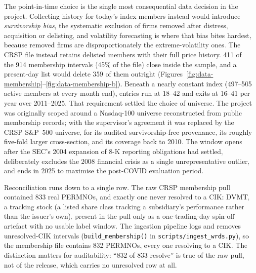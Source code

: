 The point-in-time choice is the single most consequential data decision in the project. Collecting history for today's index members instead would introduce \emph{survivorship bias}, the systematic exclusion of firms removed after distress, acquisition or delisting, and volatility forecasting is where that bias bites hardest, because removed firms are disproportionately the extreme-volatility ones. The CRSP file instead retains delisted members with their full price history. 411 of the 914 membership intervals (45\% of the file) close inside the sample, and a present-day list would delete 359 of them outright (Figures~\ref{fig:data-membership}--\ref{fig:data-membership-b}). %
Beneath a nearly constant index (497--505 active members at every month end), entries run at 18--42 and exits at 16--41 per year over 2011--2025. %
That requirement settled the choice of universe. The project was originally scoped around a Nasdaq-100 universe reconstructed from public membership records; with the supervisor's agreement it was replaced by the CRSP S\&P~500 universe, for its audited survivorship-free provenance, its roughly five-fold larger cross-section, and its coverage back to 2010. %
The window opens after the SEC's 2004 expansion of 8-K reporting obligations had settled, deliberately excludes the 2008 financial crisis as a single unrepresentative outlier, and ends in 2025 to maximise the post-COVID evaluation period.

Reconciliation runs down to a single row. The raw CRSP membership pull contained 833 real PERMNOs, and exactly one never resolved to a CIK: DVMT, a tracking stock (a listed share class tracking a subsidiary's performance rather than the issuer's own), present in the pull only as a one-trading-day spin-off artefact with no usable label window. %
The ingestion pipeline logs and removes unresolved-CIK intervals (\texttt{build\_membership()} in \texttt{scripts/ingest\_wrds.py}), so the membership file contains 832 PERMNOs, every one resolving to a CIK. %
The distinction matters for auditability: ``832 of 833 resolve'' is true of the raw pull, not of the release, which carries no unresolved row at all.

